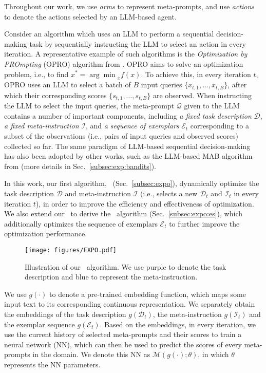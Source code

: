 Throughout our work, we use \emph{arms} to represent meta-prompts, and use \emph{actions} to denote the actions selected by an LLM-based agent.

Consider an algorithm which uses an LLM to perform a sequential decision-making task by sequentially instructing the LLM to select an action in every iteration.
A representative example of such algorithms is the \emph{Optimization by PROmpting} (OPRO) algorithm from \citet{yang2023large}. OPRO aims to solve an optimization problem, i.e., to find $x^* = {\arg\min}_{x}f(x)$. To achieve this, in every iteration $t$, OPRO uses an LLM to select a batch of $B$ input queries $\{x_{t,1},\ldots,x_{t,B}\}$, after which their corresponding scores $\{s_{t,1},\ldots,s_{t,B}\}$ are observed. When instructing the LLM to select the input queries, the meta-prompt $\mathcal{Q}$ given to the LLM contains a number of important components, including \emph{a fixed task description} $\mathcal{D}$, \emph{a fixed meta-instruction} $\mathcal{I}$, and \emph{a sequence of exemplars} $\mathcal{E}_t$ corresponding to a subset of the observations (i.e., pairs of input queries and observed scores) collected so far.
The same paradigm of LLM-based sequential decision-making has also been adopted by other works, such as the LLM-based MAB algorithm from \citet{krishnamurthy2024can} (more details in Sec.~\ref{subsec:exp:bandits}).

In this work, our first algorithm, \alg~(Sec.~\ref{subsec:expo}), 
dynamically optimize the task description $\mathcal{D}$ and meta-instruction $\mathcal{I}$ (i.e., selects a new $\mathcal{D}_t$ and $\mathcal{I}_t$ in every iteration $t$), in order to improve the efficiency and effectiveness of optimization.
We also extend our \alg~to derive the \alges~algorithm (Sec.~\ref{subsec:expo:es}), which additionally optimizes the sequence of exemplars $\mathcal{E}_t$ to further improve the optimization performance.
\begin{figure*}[t]
\centering
\texttt{[image: figures/EXPO.pdf]} \\
\vspace{-5mm}
 \caption{
 Illustration of our \alg~algorithm. 
 We use {\color{violet}purple} to denote the task description and {\color{blue}blue} to represent the meta-instruction.
 }
 \label{fig:expo:algo}
\vspace{-2.5mm}
\end{figure*}
We use $g(\cdot)$ to denote a pre-trained embedding function, which maps some input text to its corresponding continuous representation.
We separately obtain the embeddings of the task description $g(\mathcal{D}_t)$, the meta-instruction $g(\mathcal{I}_t)$ and the exemplar sequence $g(\mathcal{E}_t)$. 
Based on the embeddings, in every iteration, we use the current history of selected meta-prompts and their scores to train a neural network (NN), which can then be used to predict the scores of every meta-prompts in the domain.
We denote this NN as $\mathcal{M}(g(\cdot); \theta)$, in which $\theta$ represents the NN parameters.

